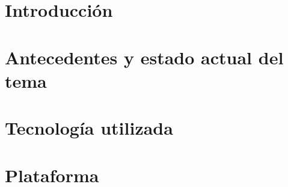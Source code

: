 \documentclass[spanish,a4paper,14pt,oneside]{extreport}
\begin{document}
  \tableofcontents
   
  \newpage{\pagestyle{empty}}
   
  \listoffigures
   
  \newpage{\pagestyle{empty}}
   
  \listoftables
   
  \newpage{\pagestyle{empty}}
   
  \renewcommand{\thepage}{\arabic{page}}
  \setcounter{page}{1}
   
   
  \chapter{Introducción}
  \label{chapter:intro}
   
  
   
   
  \chapter{Antecedentes y estado actual del tema}
  \label{chapter:Estadodelarte}
   
  
   
  \newpage{\pagestyle{empty}}
  \thispagestyle{empty}
   
  \chapter{Tecnología utilizada}
  \label{chapter:tres}
   
  
   
   
  \chapter{Plataforma}
  \label{chapter:cuatro}
   
  
   
\end{document}
